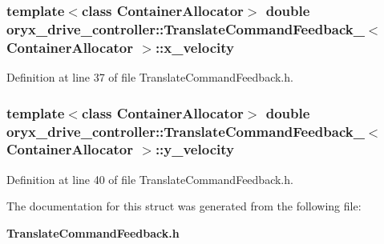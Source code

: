 \subsubsection[{x\-\_\-velocity}]{\setlength{\rightskip}{0pt plus 5cm}template$<$class \-Container\-Allocator$>$ double {\bf oryx\-\_\-drive\-\_\-controller\-::\-Translate\-Command\-Feedback\-\_\-}$<$ \-Container\-Allocator $>$\-::{\bf x\-\_\-velocity}}\label{structoryx__drive__controller_1_1TranslateCommandFeedback___addb5657286f26e7b845c3ead381c998e}


\-Definition at line 37 of file \-Translate\-Command\-Feedback.\-h.

\subsubsection[{y\-\_\-velocity}]{\setlength{\rightskip}{0pt plus 5cm}template$<$class \-Container\-Allocator$>$ double {\bf oryx\-\_\-drive\-\_\-controller\-::\-Translate\-Command\-Feedback\-\_\-}$<$ \-Container\-Allocator $>$\-::{\bf y\-\_\-velocity}}\label{structoryx__drive__controller_1_1TranslateCommandFeedback___a90d0101f9e1fbe7cefba89bd6c5a4005}


\-Definition at line 40 of file \-Translate\-Command\-Feedback.\-h.



\-The documentation for this struct was generated from the following file\-:\begin{DoxyCompactItemize}
\item 
{\bf \-Translate\-Command\-Feedback.\-h}\end{DoxyCompactItemize}
